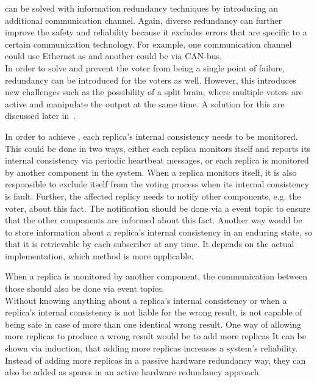 \ChallengeComm can be solved with information redundancy techniques by introducing an additional communication channel.
Again, diverse redundancy can further improve the safety and reliability because it excludes errors that are specific to a certain communication technology.
For example, one communication channel could use Ethernet as and another could be via CAN-bus.
\\

In order to solve \ChallengeVoter and prevent the voter from being a single point of failure, redundancy can be introduced for the voters as well.
However, this introduces new challenges such as the possibility of a split brain, where multiple voters are active and manipulate the output at the same time.
A solution for this are discussed later in~.

In order to achieve \ChallengeWR, each replica's internal consistency needs to be monitored.
This could be done in two ways, either each replica monitors itself and reports its internal consistency via periodic heartbeat messages, or each replica is monitored by another component in the system.
When a replica monitors itself, it is also responsible to exclude itself from the voting process when its internal consistency is fault.
Further, the affected replicy needs to notify other components, e.g. the voter, about this fact.
The notification should be done via a  event topic to ensure that the other components are informed about this fact.
Another way would be to store information about a replica's internal consistency in an enduring  state, so that it is retrievable by each subscriber at any time.
It depends on the actual implementation, which method is more applicable.

When a replica is monitored by another component, the communication between those should also be done via  event topics.
\\

Without knowing anything about a replica's internal consistency or when a replica's internal consistency is not liable for the wrong result,  is not capable of being safe in case of more than one identical wrong result.
One way of allowing more replicas to produce a wrong result would be to add more replicas
It can be shown via induction, that adding more replicas increases a system's reliability.
Instead of adding more replicas in a passive hardware redundancy way, they can also be added as spares in an active hardware redundancy approach.

